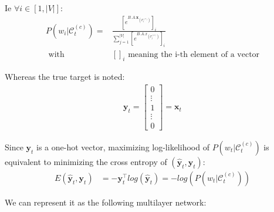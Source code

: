 Ie $\forall i \in [1, |V|]$:
\begin{align}
 P(w_{i} | \mathcal{C}_t^{(c)})= 
 	&\frac{  [e^{B.A.\mathbf{x}_{(\mathcal{C}_t^{(c)})}}]_i}
 	{\sum_{j=1}^{|V|} [e^{B.A.x_{(\mathcal{C}_j^{(c)})}}]_i} \\
 	\text{      with}& []_i \text{ meaning the i-th element of a vector}
\end{align}


Whereas the true target is noted:
\begin{align}
 \mathbf{y}_t = 
	\begin{bmatrix} 
		0 \\
		\vdots \\
		1 \\
		\vdots \\
		0
	\end{bmatrix} 
	= \mathbf{x}_t
\end{align}


Since $\mathbf{y}_t$ is a one-hot vector, maximizing log-likelihood of $P(w_t | \mathcal{C}_t^{(c)})$ is equivalent to minimizing the cross entropy of $(\mathbf{\hat y}_t, \mathbf{y}_t)$:
\begin{align}
E(\mathbf{\hat y}_t, \mathbf{y}_t) &= - \mathbf{y}_t^{\top} log(\mathbf{\hat y}_t) = - log(P(w_t | \mathcal{C}_t^{(c)}))
\end{align}

We can represent it as the following multilayer network:

